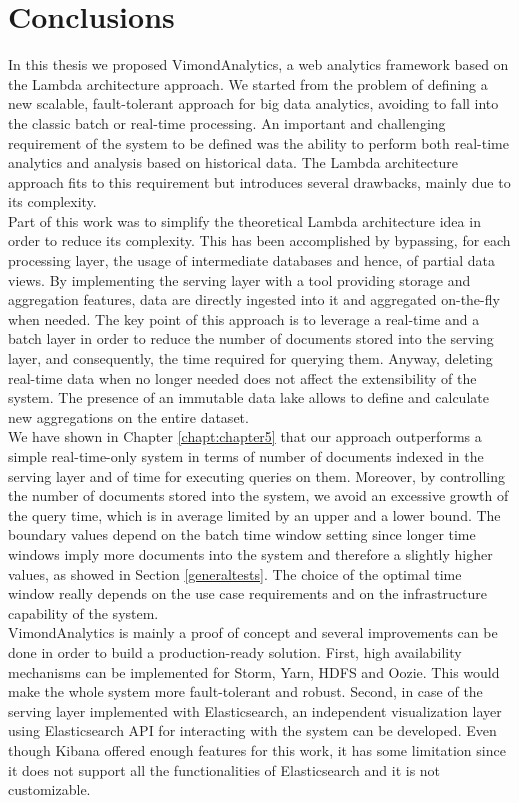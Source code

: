 \chapter{Conclusions}
\label{chapt:chapter6}

In this thesis we proposed VimondAnalytics, a web analytics framework based on the Lambda architecture approach. We started from the problem of defining a new scalable, fault-tolerant approach for big data analytics, avoiding to fall into the classic batch or real-time processing. An important and challenging requirement of the system to be defined was the ability to perform both real-time analytics and analysis based on historical data. The Lambda architecture approach fits to this requirement but introduces several drawbacks, mainly due to its complexity.\\
Part of this work was to simplify the theoretical Lambda architecture idea in order to reduce its complexity. This has been accomplished by bypassing, for each processing layer, the usage of intermediate databases and hence, of partial data views. By implementing the serving layer with a tool providing storage and aggregation features, data are directly ingested into it and aggregated on-the-fly when needed. The key point of this approach is to leverage a real-time and a batch layer in order to reduce the number of documents stored into the serving layer, and consequently, the time required for querying them. Anyway, deleting real-time data when no longer needed does not affect the extensibility of the system. The presence of an immutable data lake allows to define and calculate new aggregations on the entire dataset.\\
We have shown in Chapter \ref{chapt:chapter5} that our approach outperforms a simple real-time-only system in terms of number of documents indexed in the serving layer and of time for executing queries on them. Moreover, by controlling the number of documents stored into the system, we avoid an excessive growth of the query time, which is in average limited by an upper and a lower bound. The boundary values depend on the batch time window setting since longer time windows imply more documents into the system and therefore a slightly higher values, as showed in Section \ref{generaltests}. The choice of the optimal time window really depends on the use case requirements and on the infrastructure capability of the system.\\
VimondAnalytics is mainly a proof of concept and several improvements can be done in order to build a production-ready solution. First, high availability mechanisms can be implemented for Storm, Yarn, HDFS and Oozie. This would make the whole system more fault-tolerant and robust. Second, in case of the serving layer implemented with Elasticsearch, an independent visualization layer using Elasticsearch API for interacting with the system can be developed. Even though Kibana offered enough features for this work, it has some limitation since it does not support all the functionalities of Elasticsearch and it is not customizable.\\
